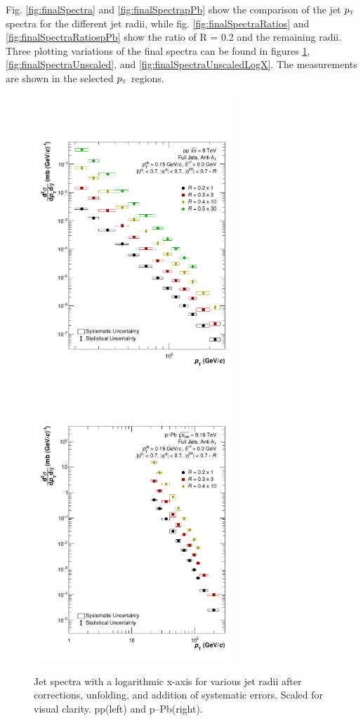 \documentclass[ALICE]{ALICE_analysis_notes}
\newcommand{\pT}{$p_{\mbox{\tiny T}}$\xspace}
\newcommand{\pPb}{{\mbox{p--Pb}}\xspace}
\newcommand{\pp}{pp\xspace}
\begin{document}
Fig. \ref{fig:finalSpectra} and \ref{fig:finalSpectrapPb} show the comparison of the jet \pT spectra for the different jet radii, while fig. \ref{fig:finalSpectraRatios} and \ref{fig:finalSpectraRatiospPb} show the ratio of R = 0.2 and the remaining radii. Three plotting variations of the final spectra can be found in figures \ref{fig:finalSpectraLogX}, \ref{fig:finalSpectraUnscaled}, and \ref{fig:finalSpectraUnscaledLogX}.
The measurements are shown in the selected \pT regions.

\begin{figure}
    \centering
    \includegraphics[width=7.5cm]{figures/FinalResults/Bayes_reg6_logx.pdf}
    \includegraphics[width=7.5cm]{figures/pPbFigures/FinalResults/Bayes_reg6_logx.pdf}
    \caption{Jet spectra with a logarithmic x-axis for various jet radii after corrections, unfolding, and addition of systematic errors. Scaled for visual clarity. \pp (left) and \pPb (right).}
    \label{fig:finalSpectraLogX}
\end{figure}
\end{document}
